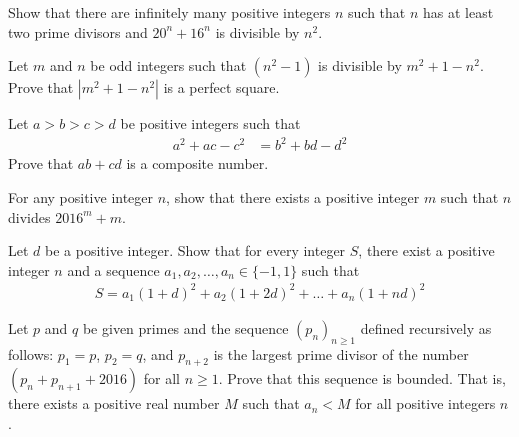 \documentclass[problems.tex]{subfile}
\begin{document}
	\begin{problem}
		Show that there are infinitely many positive integers $n$ such that $n$ has at least two prime divisors and $20^n + 16^n$ is divisible by $n^2$.
	\end{problem}

	\begin{problem}
		Let $m$ and $n$ be odd integers such that $(n^2 - 1)$ is divisible by $m^2 + 1 - n^2$. Prove that $|m^2 + 1 - n^2|$ is a perfect square.
	\end{problem}

	\begin{problem}
		Let $a > b > c > d$ be positive integers such that
			\begin{align*}
				a^2 + ac - c^2
					& = b^2 + bd - d^2
			\end{align*}
		Prove that $ab + cd$ is a composite number.
	\end{problem}

	\begin{problem}
		For any positive integer $n$, show that there exists a positive integer $m$ such that $n$ divides $2016^m + m$.
	\end{problem}

	\begin{problem}
		Let $d$ be a positive integer. Show that for every integer $S$, there exist a positive integer $n$ and a sequence $a_1, a_2,\dots , a_n \in \{-1, 1\}$ such that
			\begin{align*}
				S = a_1(1 + d)^2 + a_2(1 + 2d)^2 + \dots + a_n(1 + nd)^2
			\end{align*}
	\end{problem}

	\begin{problem}
		Let $p$ and $q$ be given primes and the sequence $(p_n)_{n\geq 1}$ defined recursively as follows: $p_1 = p$, $p_2 = q$, and $p_{n+2}$ is the largest prime divisor of the number $(p_n + p_{n+1} + 2016)$ for all $n \geq 1$. Prove that this sequence is bounded. That is, there exists a positive real number $M$ such that $a_n < M$ for all positive integers $n$.
	\end{problem}
\end{document}
